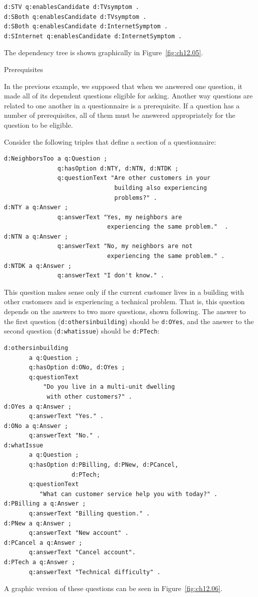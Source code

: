 \begin{lstlisting}
d:STV q:enablesCandidate d:TVsymptom .
d:SBoth q:enablesCandidate d:TVsymptom .
d:SBoth q:enablesCandidate d:InternetSymptom .
d:SInternet q:enablesCandidate d:InternetSymptom .
\end{lstlisting}

The dependency tree is shown graphically in Figure~\ref{fig:ch12.05}.

\begin{example}{Prerequisites}

In the previous example, we supposed that when we answered one question,
it made all of its dependent questions eligible for asking. Another way
questions are related to one another in a questionnaire is a
prerequisite. If a question has a number of prerequisites, all of them
must be answered appropriately for the question to be eligible.

Consider the following triples that define a section of a questionnaire:

\begin{lstlisting}
d:NeighborsToo a q:Question ;
               q:hasOption d:NTY, d:NTN, d:NTDK ;
               q:questionText "Are other customers in your 
                               building also experiencing
                               problems?" .
d:NTY a q:Answer ;
               q:answerText "Yes, my neighbors are 
                             experiencing the same problem."  .
d:NTN a q:Answer ;
               q:answerText "No, my neighbors are not 
                             experiencing the same problem." .
d:NTDK a q:Answer ;
               q:answerText "I don't know." .
\end{lstlisting}

This question makes sense only if the current customer lives in a
building with other customers and is experiencing a technical problem.
That is, this question depends on the answers to two more questions,
shown following. The answer to the first question (\texttt{d:othersinbuilding})
should be \texttt{d:OYes}, and the answer to the second question (\texttt{d:whatissue})
should be \texttt{d:PTech}:

\begin{lstlisting}
d:othersinbuilding
       a q:Question ;
       q:hasOption d:ONo, d:OYes ;
       q:questionText
           "Do you live in a multi-unit dwelling 
            with other customers?" .
d:OYes a q:Answer ;
       q:answerText "Yes." .
d:ONo a q:Answer ;
       q:answerText "No." .
d:whatIssue
       a q:Question ;
       q:hasOption d:PBilling, d:PNew, d:PCancel,
                   d:PTech;
       q:questionText
          "What can customer service help you with today?" .
d:PBilling a q:Answer ;
       q:answerText "Billing question." .
d:PNew a q:Answer ;
       q:answerText "New account" .
d:PCancel a q:Answer ;
       q:answerText "Cancel account".  
d:PTech a q:Answer ;
       q:answerText "Technical difficulty" .
\end{lstlisting}

A graphic version of these questions can be seen in Figure~\ref{fig:ch12.06}.
\end{example}
